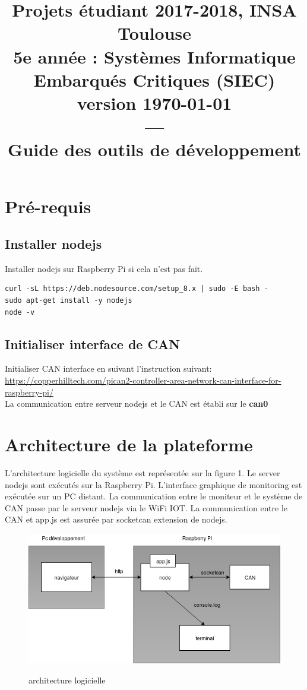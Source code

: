 \documentclass[11pt, a4paper]{paper}
\title{{Projets étudiant 2017-2018, INSA Toulouse \\ 5e année : Systèmes Informatique Embarqués Critiques (SIEC)}\\
{\large version \today}\\
---\\
{Guide des outils de développement}
}
\author{}
\begin{document}
\maketitle

\newpage


\section{ Pré-requis }
\subsection{Installer nodejs}
Installer nodejs sur Raspberry Pi si cela n’est pas fait.
\begin{verbatim}
curl -sL https://deb.nodesource.com/setup_8.x | sudo -E bash -
sudo apt-get install -y nodejs
node -v
\end{verbatim}
\subsection{Initialiser interface de CAN}
Initialiser CAN interface en suivant l’instruction suivant:\\
\url{https://copperhilltech.com/pican2-controller-area-network-can-interface-for-raspberry-pi/}\\
La communication entre serveur nodejs et le CAN est établi sur le \textbf{can0}

\section{ Architecture de la plateforme}

L’architecture logicielle du système est représentée sur la figure 1. Le server nodejs sont exécutés sur la Raspberry Pi. L’interface graphique de monitoring est exécutée sur un PC distant. La communication entre le moniteur et le système de CAN passe par le serveur nodejs via le WiFi IOT. La communication entre le CAN et app.js est assurée par socketcan extension de nodejs.

\begin{figure}[htbp]
\label{fig:architecture_logicielle}
\begin{center}
{\includegraphics[scale=.5]{./figures-pdf/architecture_logicielle}}
{\caption{architecture logicielle}}
\end{center}
\end{figure}
\end{document}
